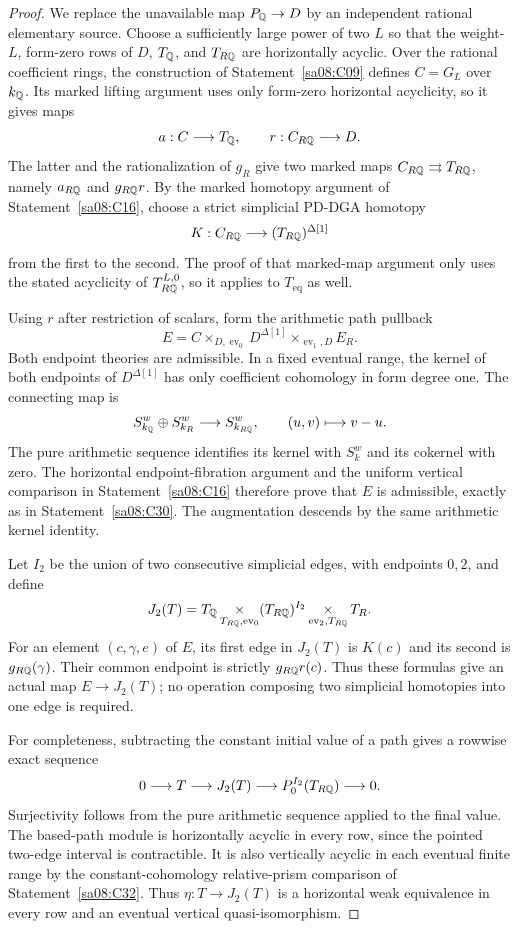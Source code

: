 \begin{proof}
We replace the unavailable map $P_\mathbb Q\to D$ by an independent
rational elementary source. Choose a sufficiently large
power of two $L$ so that the weight-$L$, form-zero rows of
$D$, $T_\mathbb Q$, and $T_{R\mathbb Q}$ are horizontally acyclic.
Over the rational coefficient rings, the construction of
Statement~\ref{sa08:C09} defines $C=G_L$ over $k_\mathbb Q$.
Its marked lifting argument uses only form-zero horizontal
acyclicity, so it gives maps
\[
 a:C\longrightarrow T_\mathbb Q,
 \qquad r:C_{R\mathbb Q}\longrightarrow D.
\]
The latter and the rationalization of $g_R$ give two marked
maps $C_{R\mathbb Q}\rightrightarrows T_{R\mathbb Q}$, namely $a_{R\mathbb Q}$
and $g_{R\mathbb Q}r$. By the marked homotopy argument of
Statement~\ref{sa08:C16}, choose a strict simplicial PD-DGA
homotopy
\[
 K:C_{R\mathbb Q}\longrightarrow (T_{R\mathbb Q})^{\Delta[1]}
\]
from the first to the second. The proof of that marked-map
argument only uses the stated acyclicity of $T_{R\mathbb Q}^{L,0}$,
so it applies to $T_{\mathrm{eq}}$ as well.

Using $r$ after restriction of scalars, form the arithmetic
path pullback
\[
 E=C\mathop{\times}_{D,\operatorname{ev}_0}D^{\Delta[1]}
      \mathop{\times}_{\operatorname{ev}_1,D}E_R.
\]
Both endpoint theories are admissible. In a fixed eventual
range, the kernel of both endpoints of $D^{\Delta[1]}$
has only coefficient cohomology in form degree one.
The connecting map is
\[
 S_{k_\mathbb Q}^w\oplus S_{k_R}^w\longrightarrow S_{k_{R\mathbb Q}}^w,
 \qquad (u,v)\longmapsto v-u.
\]
The pure arithmetic sequence identifies its kernel with
$S_k^w$ and its cokernel with zero. The horizontal
endpoint-fibration argument and the uniform vertical
comparison in Statement~\ref{sa08:C16} therefore prove
that $E$ is admissible, exactly as in
Statement~\ref{sa08:C30}. The augmentation descends by
the same arithmetic kernel identity.

Let $I_2$ be the union of two consecutive simplicial edges,
with endpoints $0,2$, and define
\[
 J_2(T)=T_\mathbb Q\mathop{\times}_{T_{R\mathbb Q},\operatorname{ev}_0}
        (T_{R\mathbb Q})^{I_2}
        \mathop{\times}_{\operatorname{ev}_2,T_{R\mathbb Q}}T_R.
\]
For an element $(c,\gamma,e)$ of $E$, its first edge in
$J_2(T)$ is $K(c)$ and its second is $g_{R\mathbb Q}(\gamma)$.
Their common endpoint is strictly $g_{R\mathbb Q}r(c)$.
Thus these formulas give an actual map $E\to J_2(T)$;
no operation composing two simplicial homotopies into one
edge is required.

For completeness, subtracting the constant initial value
of a path gives a rowwise exact sequence
\[
 0\longrightarrow T\longrightarrow J_2(T)
   \longrightarrow P_0^{I_2}(T_{R\mathbb Q})\longrightarrow0.
\]
Surjectivity follows from the pure arithmetic sequence
applied to the final value. The based-path module is
horizontally acyclic in every row, since the pointed
two-edge interval is contractible. It is also vertically
acyclic in each eventual finite range by the
constant-cohomology relative-prism comparison of
Statement~\ref{sa08:C32}. Thus $\eta:T\to J_2(T)$ is a
horizontal weak equivalence in every row and an eventual
vertical quasi-isomorphism.


\end{proof}
